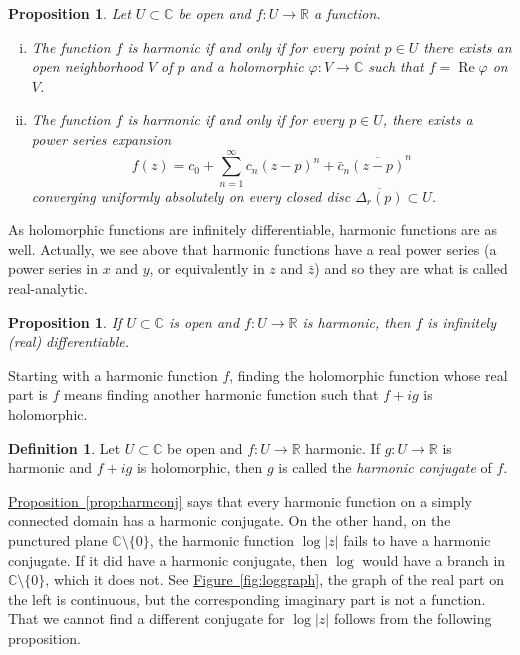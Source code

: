 \documentclass[12pt,openany]{book}
\renewcommand{\Re}{\operatorname{Re}}
\newcommand{\sabs}[1]{\lvert {#1} \rvert}
\newcommand{\C}{{\mathbb{C}}}
\newcommand{\R}{{\mathbb{R}}}
\newcommand{\myindex}[1]{#1\index{#1}}
\theoremstyle{plain}
\newtheorem{prop}[thm]{Proposition}
\theoremstyle{remark}
\theoremstyle{definition}
\newtheorem{defn}[thm]{Definition}
\theoremstyle{exercise}
\theoremstyle{example}
\newcommand{\figureref}[1]{\hyperref[#1]{Figure~\ref*{#1}}}
\newcommand{\propref}[1]{\hyperref[#1]{Proposition~\ref*{#1}}}
\begin{document}
\begin{prop} \label{prop:harmanal}
Let $U \subset \C$ be open and $f \colon U \to \R$ a function.
\begin{enumerate}[(i)]
\item
The function $f$ is harmonic if and only if
for every point $p \in U$ there exists an open neighborhood $V$ of $p$ and a
holomorphic $\varphi \colon V \to \C$ such that $f = \Re \varphi$
on $V$.
\item
The function $f$ is harmonic if and only if
for every $p \in U$, there exists a power series expansion
\begin{equation*}
f(z) =
c_0
+
\sum_{n=1}^\infty c_n {(z-p)}^n + \bar{c}_n {\overline{(z-p)}}^n
\end{equation*}
converging uniformly absolutely
on every closed disc $\overline{\Delta_r(p)} \subset U$.
\end{enumerate}
\end{prop}

As holomorphic functions are
infinitely differentiable, harmonic functions are as well.
Actually, we see above that harmonic functions have a real power series
(a power series in $x$ and $y$, or equivalently in $z$ and $\bar{z}$)
and so they are what is called real-analytic.

\begin{prop}
If $U \subset \C$ is open and $f \colon U \to \R$ is harmonic, then $f$ is infinitely (real) differentiable.
\end{prop}

Starting with a harmonic function $f$, finding the holomorphic function whose
real part is $f$ means finding another harmonic function such that $f+ig$ is
holomorphic.

\begin{defn}
Let $U \subset \C$ be open and $f \colon U \to \R$ harmonic.
If $g \colon U \to \R$ is harmonic and $f + i g$ is holomorphic,
then $g$ is called the \emph{\myindex{harmonic conjugate}} of $f$.
\end{defn}

\propref{prop:harmconj}
says that every harmonic function on a simply connected
domain has a harmonic conjugate.  On the other hand, on the punctured plane
$\C \setminus \{ 0 \}$, the harmonic function $\log \sabs{z}$ 
fails to have a harmonic conjugate.  If it did have a harmonic conjugate,
then $\log$ would have a branch in $\C \setminus \{0\}$, which it does not.
See \figureref{fig:loggraph}, the graph of the real part on the left is
continuous, but the corresponding imaginary part is not a function.
That we cannot find a different conjugate for $\log \sabs{z}$
follows from the following proposition.
\end{document}

